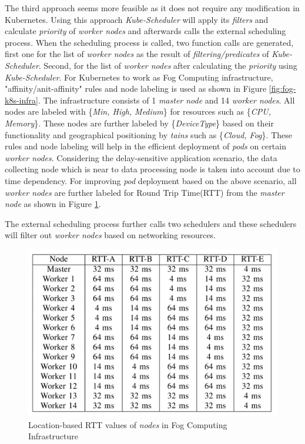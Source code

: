 The third approach seems more feasible as it does not require any modification in Kubernetes. Using this approach \emph{Kube-Scheduler} will apply its \emph{filters} and calculate \emph{priority} of \emph{worker nodes} and afterwards calls the external scheduling process\cite{Santos2019}. When the scheduling process is called, two function calls are generated\cite{Santos2019}, first one for the list of \emph{worker nodes} as the result of \emph{filtering/predicates} of \emph{Kube-Scheduler}\cite{Santos2019}. Second, for the list of \emph{worker nodes} after calculating the \emph{priority} using \emph{Kube-Scheduler}\cite{Santos2019}. For Kubernetes to work as Fog Computing infrastructure, "affinity/anit-affinity" rules and node labeling is used as shown in Figure \ref{fig:fog-k8s-infra}. The infrastructure consists of 1 \emph{master node} and 14 \emph{worker nodes}. All nodes are labeled with \{\emph{Min, High, Medium}\} for resources such as \{\emph{CPU, Memory}\}\cite{Santos2019}. These nodes are further labeled by \{\emph{DeviceType}\} based on their functionality and geographical positioning by \emph{tains} such as \{\emph{Cloud, Fog}\}\cite{Santos2019}. These rules and node labeling will help in the efficient deployment of \emph{pods} on certain \emph{worker nodes}. Considering the delay-sensitive application scenario, the data collecting node which is near to data processing node is taken into account due to time dependency\cite{Santos2019}. For improving \emph{pod} deployment based on the above scenario, all \emph{worker nodes} are further labeled for Round Trip Time(RTT) from the \emph{master node}\cite{Santos2019} as shown in Figure \ref{fig:k8s-rtt}.\par
The external scheduling process further calls two schedulers and these schedulers will filter out \emph{worker nodes} based on networking resources.
\begin{figure}
  \centering
  \includegraphics[width=\linewidth]{figures/mlcn-k8s-rtt.pdf}
  \caption{Location-based RTT values of \emph{nodes} in Fog Computing Infrastructure\cite{Santos2019}}
  \label{fig:k8s-rtt}
\end{figure}
